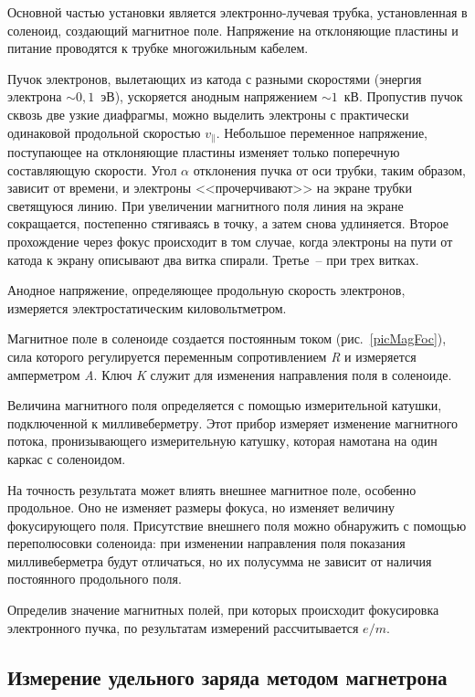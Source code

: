 \documentclass[pscyr,titlepage]{hedreport}
\begin{document}
  Основной частью установки является электронно-лучевая трубка, установленная в
  соленоид, создающий магнитное поле. Напряжение на отклоняющие пластины и
  питание проводятся к трубке многожильным кабелем.

  Пучок электронов, вылетающих из катода с разными скоростями (энергия электрона
  \( \sim 0,\!1 \)~эВ), ускоряется анодным напряжением \( \sim 1 \)~кВ.
  Пропустив пучок сквозь две узкие диафрагмы, можно выделить электроны с
  практически одинаковой продольной скоростью \( v_\| \). Небольшое переменное
  напряжение, поступающее на отклоняющие пластины изменяет только поперечную
  составляющую скорости. Угол \( \alpha \) отклонения пучка от оси трубки, таким
  образом, зависит от времени, и электроны <<прочерчивают>> на экране трубки
  светящуюся линию. При увеличении магнитного поля линия на экране сокращается,
  постепенно стягиваясь в точку, а затем снова удлиняется. Второе прохождение
  через фокус происходит в том случае, когда электроны на пути от катода к
  экрану описывают два витка спирали. Третье~-- при трех витках.

  Анодное напряжение, определяющее продольную скорость электронов, измеряется
  электростатическим киловольтметром.

  Магнитное поле в соленоиде создается постоянным током (рис.~\ref{picMagFoc}),
  сила которого регулируется переменным сопротивлением \emph{R} и измеряется
  амперметром \emph{A}. Ключ \emph{K} служит для изменения направления поля в
  соленоиде.

  Величина магнитного поля определяется с помощью измерительной катушки,
  подключенной к милливеберметру. Этот прибор измеряет изменение магнитного
  потока, пронизывающего измерительную катушку, которая намотана на один каркас
  с соленоидом.

  На точность результата может влиять внешнее магнитное поле, особенно
  продольное. Оно не изменяет размеры фокуса, но изменяет величину фокусирующего
  поля. Присутствие внешнего поля можно обнаружить с помощью переполюсовки
  соленоида: при изменении направления поля показания милливеберметра будут
  отличаться, но их полусумма не зависит от наличия постоянного продольного
  поля.

  Определив значение магнитных полей, при которых происходит фокусировка
  электронного пучка, по результатам измерений рассчитывается \( e/m \).

  \subsection{Измерение удельного заряда методом магнетрона}
\end{document}
